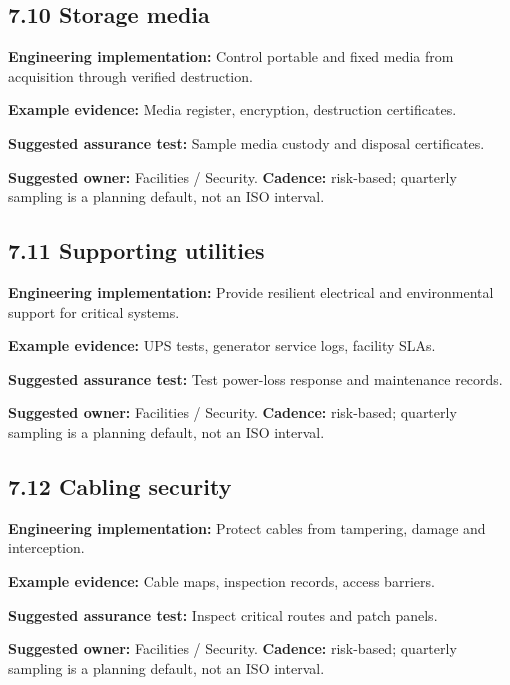 \documentclass[11pt,letterpaper]{article}
\begin{document}
\subsection{7.10 Storage media}
\textbf{Engineering implementation:} Control portable and fixed media from acquisition through verified destruction.\par
\textbf{Example evidence:} Media register, encryption, destruction certificates.\par
\textbf{Suggested assurance test:} Sample media custody and disposal certificates.\par
\textbf{Suggested owner:} Facilities / Security. \textbf{Cadence:} risk-based; quarterly sampling is a planning default, not an ISO interval.\par
{}
\subsection{7.11 Supporting utilities}
\textbf{Engineering implementation:} Provide resilient electrical and environmental support for critical systems.\par
\textbf{Example evidence:} UPS tests, generator service logs, facility SLAs.\par
\textbf{Suggested assurance test:} Test power-loss response and maintenance records.\par
\textbf{Suggested owner:} Facilities / Security. \textbf{Cadence:} risk-based; quarterly sampling is a planning default, not an ISO interval.\par
{}
\subsection{7.12 Cabling security}
\textbf{Engineering implementation:} Protect cables from tampering, damage and interception.\par
\textbf{Example evidence:} Cable maps, inspection records, access barriers.\par
\textbf{Suggested assurance test:} Inspect critical routes and patch panels.\par
\textbf{Suggested owner:} Facilities / Security. \textbf{Cadence:} risk-based; quarterly sampling is a planning default, not an ISO interval.\par
{}
\end{document}
